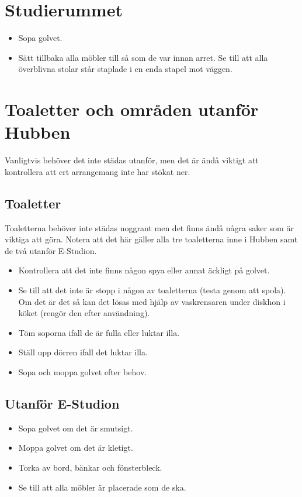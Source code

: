 \section{Studierummet}
\begin{itemize}
    \item Sopa golvet.
    \item Sätt tillbaka alla möbler till så som de var innan arret. Se till att alla överblivna stolar står staplade i en enda stapel mot väggen.
\end{itemize}

\section{Toaletter och områden utanför Hubben}
Vanligtvis behöver det inte städas utanför, men det är ändå viktigt att kontrollera att ert arrangemang inte har stökat ner.
\subsection{Toaletter}
Toaletterna behöver inte städas noggrant men det finns ändå några saker som är viktiga att göra. Notera att det här gäller alla tre toaletterna inne i Hubben samt de två utanför E-Studion.
\begin{itemize}
    \item Kontrollera att det inte finns någon spya eller annat äckligt på golvet.
    \item Se till att det inte är stopp i någon av toaletterna (testa genom att spola). Om det är det så kan det lösas med hjälp av vaskrensaren under diskhon i köket (rengör den efter användning).
    \item Töm soporna ifall de är fulla eller luktar illa.
    \item Ställ upp dörren ifall det luktar illa.
    \item Sopa och moppa golvet efter behov.
\end{itemize}

\subsection{Utanför E-Studion}
\begin{itemize}
    \item Sopa golvet om det är smutsigt.
    \item Moppa golvet om det är kletigt.
    \item Torka av bord, bänkar och fönsterbleck.
    \item Se till att alla möbler är placerade som de ska.
\end{itemize}

